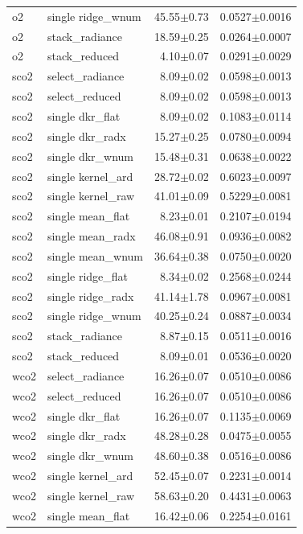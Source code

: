 {\begin{longtable}{llrr}
o2 & single ridge\_wnum & 45.55$\pm$0.73 & 0.0527$\pm$0.0016 \\
o2 & stack\_radiance & 18.59$\pm$0.25 & 0.0264$\pm$0.0007 \\
o2 & stack\_reduced & 4.10$\pm$0.07 & 0.0291$\pm$0.0029 \\
sco2 & select\_radiance & 8.09$\pm$0.02 & 0.0598$\pm$0.0013 \\
sco2 & select\_reduced & 8.09$\pm$0.02 & 0.0598$\pm$0.0013 \\
sco2 & single dkr\_flat & 8.09$\pm$0.02 & 0.1083$\pm$0.0114 \\
sco2 & single dkr\_radx & 15.27$\pm$0.25 & 0.0780$\pm$0.0094 \\
sco2 & single dkr\_wnum & 15.48$\pm$0.31 & 0.0638$\pm$0.0022 \\
sco2 & single kernel\_ard & 28.72$\pm$0.02 & 0.6023$\pm$0.0097 \\
sco2 & single kernel\_raw & 41.01$\pm$0.09 & 0.5229$\pm$0.0081 \\
sco2 & single mean\_flat & 8.23$\pm$0.01 & 0.2107$\pm$0.0194 \\
sco2 & single mean\_radx & 46.08$\pm$0.91 & 0.0936$\pm$0.0082 \\
sco2 & single mean\_wnum & 36.64$\pm$0.38 & 0.0750$\pm$0.0020 \\
sco2 & single ridge\_flat & 8.34$\pm$0.02 & 0.2568$\pm$0.0244 \\
sco2 & single ridge\_radx & 41.14$\pm$1.78 & 0.0967$\pm$0.0081 \\
sco2 & single ridge\_wnum & 40.25$\pm$0.24 & 0.0887$\pm$0.0034 \\
sco2 & stack\_radiance & 8.87$\pm$0.15 & 0.0511$\pm$0.0016 \\
sco2 & stack\_reduced & 8.09$\pm$0.01 & 0.0536$\pm$0.0020 \\
wco2 & select\_radiance & 16.26$\pm$0.07 & 0.0510$\pm$0.0086 \\
wco2 & select\_reduced & 16.26$\pm$0.07 & 0.0510$\pm$0.0086 \\
wco2 & single dkr\_flat & 16.26$\pm$0.07 & 0.1135$\pm$0.0069 \\
wco2 & single dkr\_radx & 48.28$\pm$0.28 & 0.0475$\pm$0.0055 \\
wco2 & single dkr\_wnum & 48.60$\pm$0.38 & 0.0516$\pm$0.0086 \\
wco2 & single kernel\_ard & 52.45$\pm$0.07 & 0.2231$\pm$0.0014 \\
wco2 & single kernel\_raw & 58.63$\pm$0.20 & 0.4431$\pm$0.0063 \\
wco2 & single mean\_flat & 16.42$\pm$0.06 & 0.2254$\pm$0.0161 \\

\end{longtable}}
